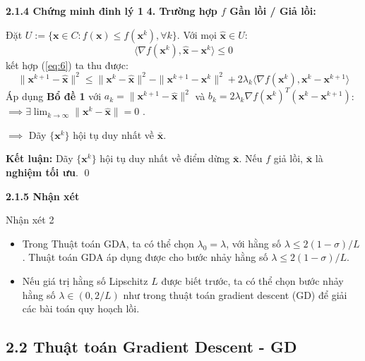 \begin{frame}{\textbf{\large 2.1.4 Chứng minh đinh lý 1}}    \vspace*{-1cm}    \textbf{4. Trường hợp $f$ Gần lồi / Giả lồi: }
    
    Đặt $U := \{\mathbf{x} \in C : f(\mathbf{x}) \le f(\mathbf{x}^k), \forall k\}$. Với mọi $\hat{\mathbf{x}} \in U$:
    $$ \langle \nabla f(\mathbf{x}^k), \hat{\mathbf{x}} - \mathbf{x}^k \rangle \le 0 $$
    kết hợp (\ref{eq:6}) ta thu được:
    \begin{equation*}
        \|\mathbf{x}^{k+1} - \hat{\mathbf{x}}\|^2 \le \|\mathbf{x}^k - \hat{\mathbf{x}}\|^2 - \|\mathbf{x}^{k+1} - \mathbf{x}^k\|^2 + 2\lambda_k \langle \nabla f(\mathbf{x}^k), \mathbf{x}^k - \mathbf{x}^{k+1} \rangle
    \end{equation*}
    Áp dụng \textbf{Bổ đề 1} với $a_k = \|\mathbf{x}^{k+1} - \hat{\mathbf{x}}\|^2$ và $b_k = 2\lambda_k \nabla f(\mathbf{x}^k)^T (\mathbf{x}^k - \mathbf{x}^{k+1})$:
    $\implies \exists \lim_{k \to \infty} \|\mathbf{x}^k - \hat{\mathbf{x}}\| = 0$ .
    
    $\implies$ Dãy $\{\mathbf{x}^k\}$ hội tụ duy nhất về $\bar{\mathbf{x}}$.
    
   \textbf{Kết luận:} Dãy $\{\mathbf{x}^k\}$ hội tụ duy nhất về điểm dừng $\bar{\mathbf{x}}$. Nếu $f$ giả lồi, $\bar{\mathbf{x}}$ là \textbf{nghiệm tối ưu}. \qed
\end{frame}
\begin{frame}{\textbf{\large 2.1.5 Nhận xét}}
    \vspace*{-1cm}
    \begin{exampleblock}{Nhận xét 2}
        \begin{itemize}
            \item Trong Thuật toán GDA, ta có thể chọn $\lambda_0 = \lambda$, với hằng số $\lambda \le 2(1 - \sigma)/L$. Thuật toán GDA áp dụng được cho bước nhảy hằng số $\lambda \le 2(1 - \sigma)/L$.
            \pause
            \item  Nếu giá trị hằng số Lipschitz $L$ được biết trước, ta có thể chọn bước nhảy hằng số $\lambda \in (0, 2/L)$ như trong thuật toán gradient descent (GD) để giải các bài toán quy hoạch lồi.
        \end{itemize}
    \end{exampleblock}
    
\end{frame}


\subsection{2.2 Thuật toán Gradient Descent - GD}



